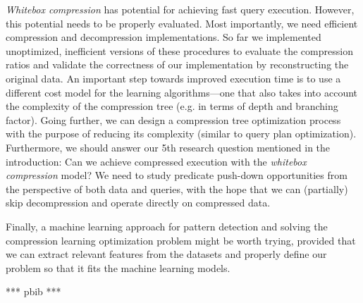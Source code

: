 \textit{Whitebox compression} has potential for achieving fast query execution. However, this potential needs to be properly evaluated. Most importantly, we need efficient compression and decompression implementations. So far we implemented unoptimized, inefficient versions of these procedures to evaluate the compression ratios and validate the correctness of our implementation by reconstructing the original data. An important step towards improved execution time is to use a different cost model for the learning algorithms---one that also takes into account the complexity of the compression tree (e.g. in terms of depth and branching factor). Going further, we can design a compression tree optimization process with the purpose of reducing its complexity (similar to query plan optimization). Furthermore, we should answer our 5th research question mentioned in the introduction: Can we achieve compressed execution with the \textit{whitebox compression} model? We need to study predicate push-down opportunities from the perspective of both data and queries, with the hope that we can (partially) skip decompression and operate directly on compressed data.

Finally, a machine learning approach for pattern detection and solving the compression learning optimization problem might be worth trying, provided that we can extract relevant features from the datasets and properly define our problem so that it fits the machine learning models.

\iffalse

*** pbib ***

